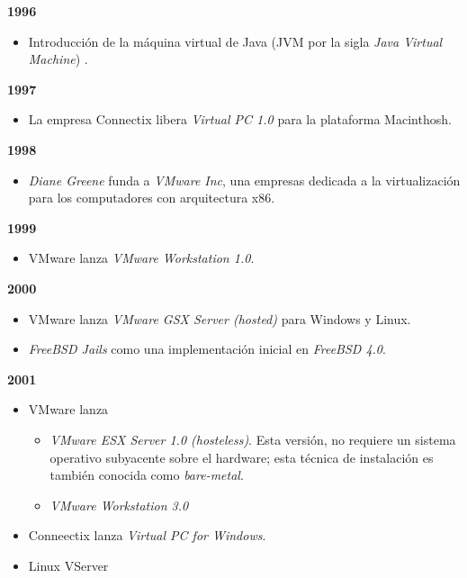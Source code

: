 \textbf{1996}\\
\begin{itemize}
	\item Introducción de la máquina virtual de Java (JVM por la sigla \textit{Java Virtual Machine}) \parencite{Lindholm1997,Douglis2013}. \\
\end{itemize}


\textbf{1997}\\
\begin{itemize}
	\item La empresa Connectix libera \textit{Virtual PC 1.0} para la plataforma Macinthosh. \\
\end{itemize}
				
\textbf{1998}\\
\begin{itemize}
	\item \textit{Diane Greene} funda a \textit{VMware Inc},  una empresas dedicada a la virtualización para los computadores con arquitectura x86.\\
\end{itemize}
				
\textbf{1999}\\
\begin{itemize}
	\item VMware lanza \textit{VMware Workstation 1.0}.\\
\end{itemize}
				
\textbf{2000}\\
\begin{itemize}
	\item VMware lanza \textit{VMware GSX Server (hosted)} para Windows y Linux.\\
	
	\item \textit{FreeBSD Jails} como una implementación inicial en \textit{FreeBSD 4.0}.\\
\end{itemize}
				
\textbf{2001}
\begin{itemize}
	\item VMware lanza 
	
	\begin{itemize}
		\item \textit{VMware ESX Server 1.0 (hosteless)}. Esta versión, no requiere un sistema operativo subyacente sobre el hardware; esta técnica de instalación es también conocida como \textit{bare-metal}. \\

		\item \textit{VMware Workstation 3.0}\\
	\end{itemize}
	
	\item Conneectix lanza \textit{Virtual PC for Windows}.  \\
	
	\item Linux VServer\\
	
\end{itemize}
				
